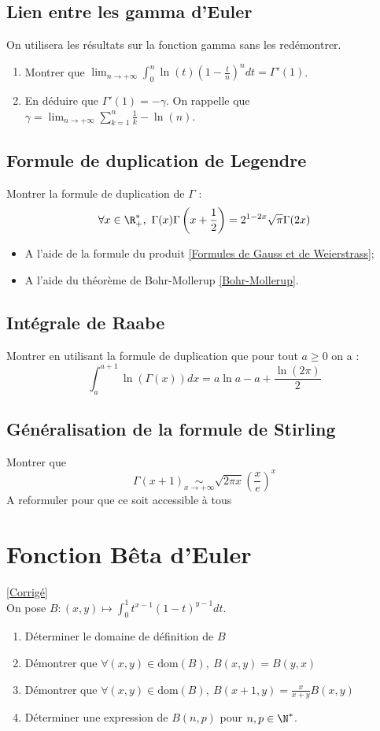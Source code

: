 \documentclass{book}
\begin{document}
	\subsection{Lien entre les gamma d'Euler }
	\label{Lien entre les gamma d'Euler}
	On utilisera les résultats sur la fonction gamma sans les redémontrer.
	\begin{enumerate}
		\item Montrer que $\displaystyle\lim_{n\to+\infty}\int_0^n\ln(t)\left(1-\frac{t}{n}\right)^ndt=\Gamma'(1)$.
		\item En déduire que $\Gamma'(1)=-\gamma$. On rappelle que $\gamma=\displaystyle\lim_{n\to+\infty}\sum_{k=1}^n\frac{1}{k}-\ln(n)$.
	\end{enumerate}
	
	\subsection{Formule de duplication de Legendre}
	\label{Formule de duplication}
	Montrer la formule de duplication de $\Gamma$ :
	$$\forall x\in \R^*_+,\ \Gamma(x)\Gamma\left(x+\frac{1}{2}\right)=2^{1-2x}\sqrt\pi\Gamma(2x)$$
	\begin{itemize}
		\item A l'aide de la formule du produit \ref{Formules de Gauss et de Weierstrass};
		\item A l'aide du théorème de Bohr-Mollerup \ref{Bohr-Mollerup}.
	\end{itemize}
	
	\subsection{Intégrale de Raabe}
	Montrer en utilisant la formule de duplication que pour tout $a\geq0$ on a :
	$$\int_a^{a+1}\ln(\Gamma(x))dx=a\ln a-a+\frac{\ln(2\pi)}{2}$$
	
	\subsection{Généralisation de la formule de Stirling}
	Montrer que \[\Gamma(x+1)\underset{x\to+\infty}{\sim}\sqrt{2\pi x}\left(\frac{x}{e}\right)^x\]
	A reformuler pour que ce soit accessible à tous
	
	\section{Fonction Bêta d'Euler}
	\textcolor{blue}{\hyperref[sec:fonction-beta-deuler]{[Corrigé]}}\\
	\label{Fonction Bêta d'Euler}
	On pose $ B : (x,y) \mapsto \displaystyle\int_0^1 t^{x-1}(1-t)^{y-1}dt$.
	\begin{enumerate}
		\item Déterminer le domaine de définition de $B$
		\item Démontrer que $\forall (x,y) \in \text{dom}(B),\ B(x,y)=B(y,x)$
		\item Démontrer que $\forall (x,y) \in \text{dom}(B),\ B(x+1,y)=\displaystyle\frac{x}{x+y}B(x,y)$
		\item Déterminer une expression de $B(n,p)$ pour $n,p\in \N^*$.
	\end{enumerate}
	
\end{document}
